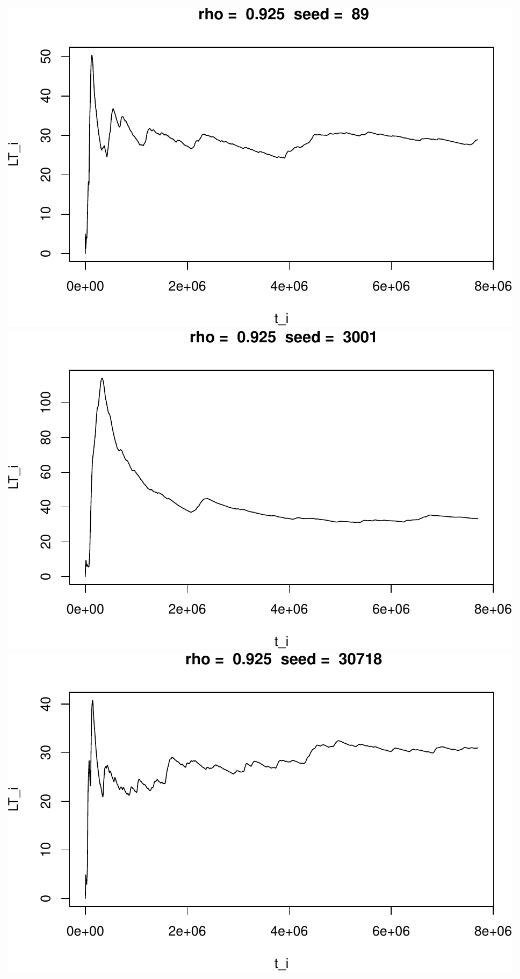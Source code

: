\documentclass[]{article}
\begin{document}
\includegraphics{003_files/figure-latex/unnamed-chunk-23-7.pdf}
\includegraphics{003_files/figure-latex/unnamed-chunk-23-8.pdf}
\includegraphics{003_files/figure-latex/unnamed-chunk-23-9.pdf}
\end{document}
